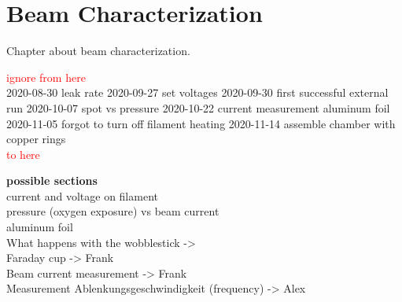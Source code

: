 
\chapter{Beam Characterization}
\label{ch:Beam Characterization}

Chapter about beam characterization.

\textcolor{red}{ignore from here} \\
2020-08-30 leak rate
2020-09-27 set voltages
2020-09-30 first successful external run
2020-10-07 spot vs pressure
2020-10-22 current measurement aluminum foil
2020-11-05 forgot to turn off filament heating
2020-11-14 assemble chamber with copper rings \\
\textcolor{red}{to here}

\noindent \textbf{possible sections} \\
current and voltage on filament \\
pressure (oxygen exposure) vs beam current \\
aluminum foil \\
What happens with the wobblestick ->  \\
Faraday cup -> Frank \\
Beam current measurement -> Frank \\
Measurement Ablenkungsgeschwindigkeit (frequency) -> Alex \\